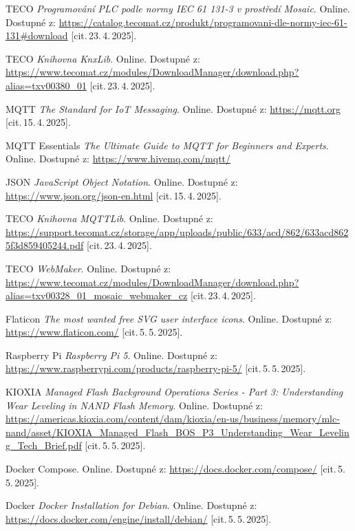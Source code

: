 \begin{thebibliography}{99}
		TECO \emph{Programování PLC podle normy IEC 61 131-3 v prostředí Mosaic}.\/ Online. 
		Dostupné z:
	\url{https://catalog.tecomat.cz/produkt/programovani-dle-normy-iec-61-131#download}
		[cit.\,23.\,4.\,2025].

		TECO \emph{Knihovna KnxLib}.\/ Online. 
		Dostupné z:
	\url{https://www.tecomat.cz/modules/DownloadManager/download.php?alias=txv00380_01}
		[cit.\,23.\,4.\,2025].

		MQTT \emph{The Standard for IoT Messaging}.\/ Online. 
		Dostupné z:
	\url{https://mqtt.org}
		[cit.\,15.\,4.\,2025].

		MQTT Essentials \emph{The Ultimate Guide to MQTT for Beginners and Experts}.\/ Online.
		Dostupné z:
		\url{https://www.hivemq.com/mqtt/}

		JSON \emph{JavaScript Object Notation}.\/ Online. 
		Dostupné z:
	\url{https://www.json.org/json-en.html}
		[cit.\,15.\,4.\,2025].

		TECO \emph{Knihovna MQTTLib}.\/ Online. 
		Dostupné z:
	\url{https://support.tecomat.cz/storage/app/uploads/public/633/acd/862/633acd8625f3d859405244.pdf}
		[cit.\,23.\,4.\,2025].

		TECO \emph{WebMaker}.\/ Online. 
		Dostupné z:
	\url{https://www.tecomat.cz/modules/DownloadManager/download.php?alias=txv00328_01_mosaic_webmaker_cz}
		[cit.\,23.\,4.\,2025].

		Flaticon \emph{The most wanted free SVG user interface icons}.\/ Online. 
		Dostupné z:
	\url{https://www.flaticon.com/}
		[cit.\,5.\,5.\,2025].

		Raspberry Pi \emph{Raspberry Pi 5}.\/ Online. 
		Dostupné z:
	\url{https://www.raspberrypi.com/products/raspberry-pi-5/}
		[cit.\,5.\,5.\,2025].

		KIOXIA \emph{Managed Flash Background Operations Series - Part 3: Understanding Wear Leveling in NAND Flash Memory}.\/ Online. 
		Dostupné z:
	\url{https://americas.kioxia.com/content/dam/kioxia/en-us/business/memory/mlc-nand/asset/KIOXIA_Managed_Flash_BOS_P3_Understanding_Wear_Leveling_Tech_Brief.pdf}
		[cit.\,5.\,5.\,2025].

		Docker Compose.\/ Online. 
		Dostupné z:
	\url{https://docs.docker.com/compose/}
		[cit.\,5.\,5.\,2025].

		Docker \emph{Docker Installation for Debian}.\/ Online. 
		Dostupné z:
	\url{https://docs.docker.com/engine/install/debian/}
		[cit.\,5.\,5.\,2025].


\end{thebibliography}
